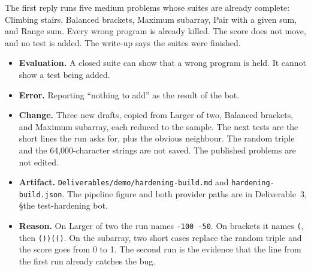 \documentclass[11pt,a4paper]{article}
\newcommand{\step}[1]{\par\vspace{0.15em}{\bfseries #1}\par\vspace{-0.15em}}
\begin{document}
\step{2. Reply (summarised)}
The first reply runs five medium problems whose suites are already complete: Climbing stairs, Balanced brackets, Maximum subarray, Pair with a given sum, and Range sum. Every wrong program is already killed. The score does not move, and no test is added. The write-up says the suites were finished.

\step{3. Decision}
\begin{itemize}
\item \textbf{Evaluation.} A closed suite can show that a wrong program is held. It cannot show a test being added.
\item \textbf{Error.} Reporting ``nothing to add'' as the result of the bot.
\item \textbf{Change.} Three new drafts, copied from Larger of two, Balanced brackets, and Maximum subarray, each reduced to the sample. The next tests are the short lines the run asks for, plus the obvious neighbour. The random triple and the 64{,}000-character strings are not saved. The published problems are not edited.
\item \textbf{Artifact.} \texttt{Deliverables/demo/hardening-build.md} and \texttt{hardening-build.json}. The pipeline figure and both provider paths are in Deliverable~3, \S the test-hardening bot.
\item \textbf{Reason.} On Larger of two the run names \texttt{-100 -50}. On brackets it names \texttt{(}, then \texttt{())(()}. On the subarray, two short cases replace the random triple and the score goes from 0 to 1. The second run is the evidence that the line from the first run already catches the bug.
\end{itemize}
\end{document}
